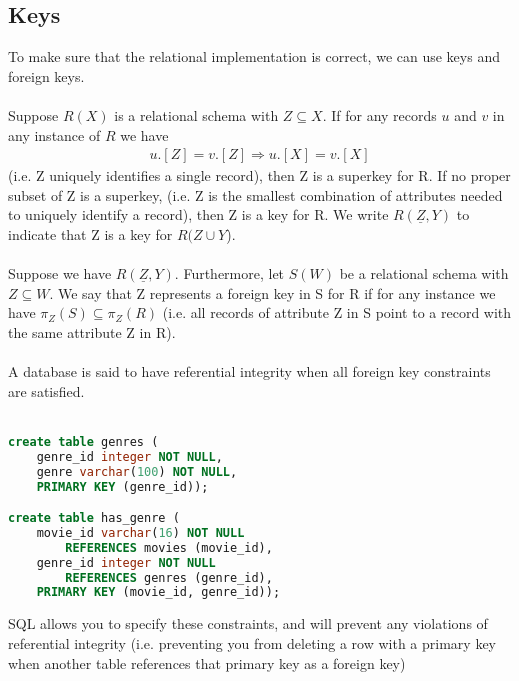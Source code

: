 \documentclass[12pt,a4paper]{article} %
\begin{document}
\subsection{Keys}
To make sure that the relational implementation is correct, we can use keys and foreign keys.
\\\\
Suppose $R(X)$ is a relational schema with $Z\subseteq X$. If for any records $u$ and $v$ in any instance of $R$ we have
\begin{align}
u.[Z]=v.[Z]\Rightarrow u.[X]=v.[X]
\end{align}
(i.e. Z uniquely identifies a single record), then Z is a superkey for R. If no proper subset of Z is a superkey, (i.e. Z is the smallest combination of attributes needed to uniquely identify a record), then Z is a key for R. We write $R(\underline{Z},Y)$ to indicate that Z is a key for $R(Z\cup Y$).
\\\\
Suppose we have $R(\underline{Z},Y)$. Furthermore, let $S(W)$ be a relational schema with $Z\subseteq W$. We say that Z represents a foreign key in S for R if for any instance we have $\pi_Z(S)\subseteq \pi_Z(R)$ (i.e. all records of attribute Z in S point to a record with the same attribute Z in R).
\\\\
A database is said to have referential integrity when all foreign key constraints are satisfied.
\\\\
\begin{lstlisting}[language=sql]
create table genres (
	genre_id integer NOT NULL,
	genre varchar(100) NOT NULL,
	PRIMARY KEY (genre_id));

create table has_genre (
	movie_id varchar(16) NOT NULL
		REFERENCES movies (movie_id),
	genre_id integer NOT NULL
		REFERENCES genres (genre_id),
	PRIMARY KEY (movie_id, genre_id));
\end{lstlisting}
SQL allows you to specify these constraints, and will prevent any violations of referential integrity (i.e. preventing you from deleting a row with a primary key when another table references that primary key as a foreign key)
\end{document}
